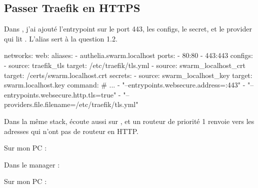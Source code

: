 
\subsection{Passer Traefik en HTTPS}

Dans , j'ai ajouté l'entrypoint  sur le port 443, les configs, le secret, et le provider  qui lit . L'alias  sert à la question 1.2.

\begin{fichier}
    networks:
      web:
        aliases:
          - authelia.swarm.localhost
    ports:
      - 80:80
      - 443:443
    configs:
      - source: traefik_tls
        target: /etc/traefik/tls.yml
      - source: swarm_localhost_crt
        target: /certs/swarm.localhost.crt
    secrets:
      - source: swarm_localhost_key
        target: swarm.localhost.key
    command:
      # ...
      - "--entrypoints.websecure.address=:443"
      - "--entrypoints.websecure.http.tls=true"
      - "--providers.file.filename=/etc/traefik/tls.yml"
\end{fichier}

Dans la même stack,  écoute aussi sur , et un routeur  de priorité 1 renvoie vers  les adresses qui n'ont pas de routeur en HTTP.

Sur mon PC :

\begin{commandes}
\end{commandes}

Dans le manager :

\begin{commandes}
\end{commandes}

Sur mon PC :

\begin{commandes}
\end{commandes}


